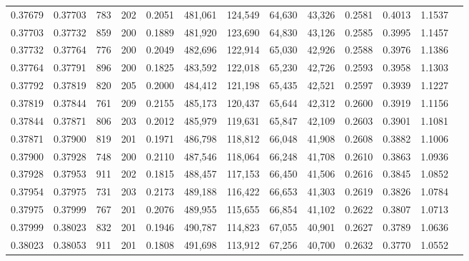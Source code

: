 \begin{tabular}{rrrrrrrrrrrrr}
0.37679 & 0.37703 &   783 & 202 &                                     0.2051 & 481,061 & 124,549 &  64,630 &  43,326 & 0.2581 & 0.4013 & 1.1537 \\
0.37703 & 0.37732 &   859 & 200 &                                     0.1889 & 481,920 & 123,690 &  64,830 &  43,126 & 0.2585 & 0.3995 & 1.1457 \\
0.37732 & 0.37764 &   776 & 200 &                                     0.2049 & 482,696 & 122,914 &  65,030 &  42,926 & 0.2588 & 0.3976 & 1.1386 \\
0.37764 & 0.37791 &   896 & 200 &                                     0.1825 & 483,592 & 122,018 &  65,230 &  42,726 & 0.2593 & 0.3958 & 1.1303 \\
0.37792 & 0.37819 &   820 & 205 &                                     0.2000 & 484,412 & 121,198 &  65,435 &  42,521 & 0.2597 & 0.3939 & 1.1227 \\
0.37819 & 0.37844 &   761 & 209 &                                     0.2155 & 485,173 & 120,437 &  65,644 &  42,312 & 0.2600 & 0.3919 & 1.1156 \\
0.37844 & 0.37871 &   806 & 203 &                                     0.2012 & 485,979 & 119,631 &  65,847 &  42,109 & 0.2603 & 0.3901 & 1.1081 \\
0.37871 & 0.37900 &   819 & 201 &                                     0.1971 & 486,798 & 118,812 &  66,048 &  41,908 & 0.2608 & 0.3882 & 1.1006 \\
0.37900 & 0.37928 &   748 & 200 &                                     0.2110 & 487,546 & 118,064 &  66,248 &  41,708 & 0.2610 & 0.3863 & 1.0936 \\
0.37928 & 0.37953 &   911 & 202 &                                     0.1815 & 488,457 & 117,153 &  66,450 &  41,506 & 0.2616 & 0.3845 & 1.0852 \\
0.37954 & 0.37975 &   731 & 203 &                                     0.2173 & 489,188 & 116,422 &  66,653 &  41,303 & 0.2619 & 0.3826 & 1.0784 \\
0.37975 & 0.37999 &   767 & 201 &                                     0.2076 & 489,955 & 115,655 &  66,854 &  41,102 & 0.2622 & 0.3807 & 1.0713 \\
0.37999 & 0.38023 &   832 & 201 &                                     0.1946 & 490,787 & 114,823 &  67,055 &  40,901 & 0.2627 & 0.3789 & 1.0636 \\
0.38023 & 0.38053 &   911 & 201 &                                     0.1808 & 491,698 & 113,912 &  67,256 &  40,700 & 0.2632 & 0.3770 & 1.0552 \\

\end{tabular}
